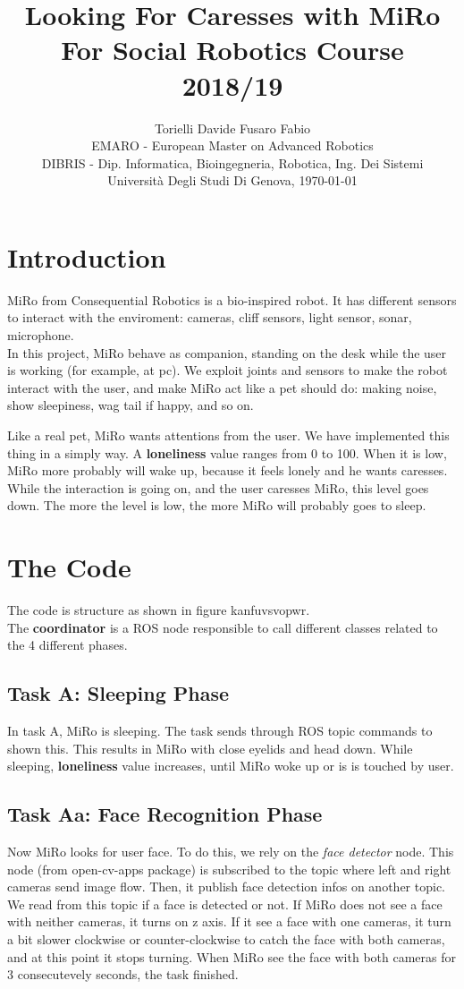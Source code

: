 \documentclass[12pt,peerreviewca, a4paper, onecolumn]{IEEEtran}
\title{\LARGE\textbf{Looking For Caresses with MiRo}\\\large For Social Robotics Course 2018/19}
\author{\large{Torielli Davide \quad Fusaro Fabio} \\
	\small EMARO - European Master on Advanced Robotics\\
	\small DIBRIS - Dip. Informatica, Bioingegneria, Robotica, Ing. Dei Sistemi\\
	\small Universit\`{a} Degli Studi Di Genova, \today}
\begin{document}
	\maketitle
	
	\section{{\large Introduction}}
	MiRo from Consequential Robotics is a bio-inspired robot. It has different sensors to interact with the enviroment: cameras, cliff sensors, light sensor, sonar, microphone.\\
	In this project, MiRo behave as companion, standing on the desk while the user is working (for example, at pc). We exploit joints and sensors to make the robot interact with the user, and make MiRo act like a pet should do: making noise, show sleepiness, wag tail if happy, and so on.	
	
	Like a real pet, MiRo wants attentions from the user. We have implemented this thing in a simply way. A \textbf{loneliness} value ranges from 0 to 100. When it is low, MiRo more probably will wake up, because it feels lonely and he wants caresses. While the interaction is going on, and the user caresses  MiRo, this level goes down. The more the level is low, the more MiRo will probably goes to sleep.
	
	\section{The Code}
	
	The code is structure as shown in figure kanfuvsvopwr.\\
	The \textbf{coordinator} is a ROS node responsible to call different classes related to the 4 different phases. 
	
	\subsection{Task A: Sleeping Phase}
	In task A, MiRo is sleeping. The task sends through ROS topic commands to shown this. This results in MiRo with close eyelids and head down. While sleeping, \textbf{loneliness} value increases, until MiRo woke up or is is touched by user.
	\subsection{Task Aa: Face Recognition Phase}
	Now MiRo looks for user face. To do this, we rely on the \textit{face detector} node. This node (from open-cv-apps package) is subscribed to the topic where left and right cameras send image flow. Then, it publish face detection infos on another topic. We read from this topic if a face is detected or not.
	If MiRo does not see a face with neither cameras, it turns on z axis. If it see a face with one cameras, it turn a bit slower clockwise or counter-clockwise to catch the face with both cameras, and at this point it stops turning. When MiRo see the face with both cameras for 3 consecutevely seconds, the task finished.
\end{document}
